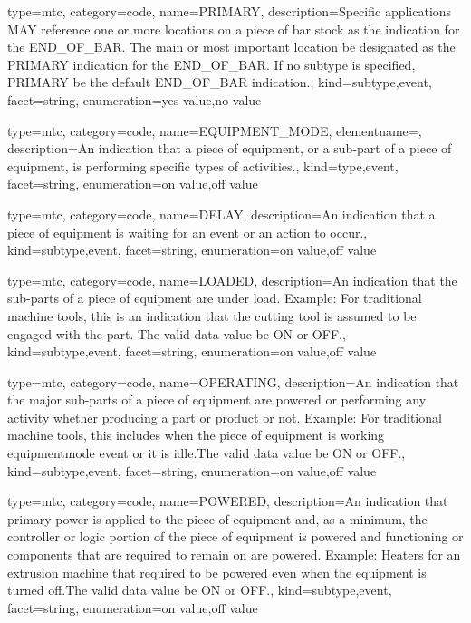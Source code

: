 {
  type=mtc,
  category=code,
  name={PRIMARY},
  description={Specific applications MAY reference one or more locations on a piece of bar stock as the indication for the END\_OF\_BAR.  The main or most important location \must be designated as the PRIMARY indication for the END\_OF\_BAR.   \newline If no \gls{subtype} is specified, PRIMARY \must be the default END\_OF\_BAR indication.},
  kind={subtype,event},
  facet={\gls{string}},
  enumeration={\gls{yes value},\gls{no value}}
}


{
  type=mtc,
  category=code,
  name={EQUIPMENT\_MODE},
  elementname=,
  description={An indication that a piece of equipment, or a sub-part of a piece of equipment, is performing specific types of activities.},
  kind={type,event},
  facet={\gls{string}},
  enumeration={\gls{on value},\gls{off value}}
}


{
  type=mtc,
  category=code,
  name={DELAY},
  description={An indication that a piece of equipment is waiting for an event or an action to occur.},
  kind={subtype,event},
  facet={\gls{string}},
  enumeration={\gls{on value},\gls{off value}}
}


{
  type=mtc,
  category=code,
  name={LOADED},
  description={An indication that the sub-parts of a piece of equipment are under load. \newline Example: For traditional machine tools, this is an indication that the cutting tool is assumed to be engaged with the part. The \gls{valid data value} \must be ON or OFF.},
  kind={subtype,event},
  facet={\gls{string}},
  enumeration={\gls{on value},\gls{off value}}
}


{
  type=mtc,
  category=code,
  name={OPERATING},
  description={An indication that the major sub-parts of a piece of equipment are powered or performing any activity whether producing a part or product or not.   \newline Example: For traditional machine tools, this includes when the piece of equipment is \gls{working equipmentmode event} or it is idle.The \gls{valid data value} \must be ON or OFF.},
  kind={subtype,event},
  facet={\gls{string}},
  enumeration={\gls{on value},\gls{off value}}
}


{
  type=mtc,
  category=code,
  name={POWERED},
  description={An indication that primary power is applied to the piece of equipment and, as a minimum, the controller or logic portion of the piece of equipment is powered and functioning or components that are required to remain on are powered. Example: Heaters for an extrusion machine that required to be powered even when the equipment is turned off.The \gls{valid data value} \must be ON or OFF.},
  kind={subtype,event},
  facet={\gls{string}},
  enumeration={\gls{on value},\gls{off value}}
}


